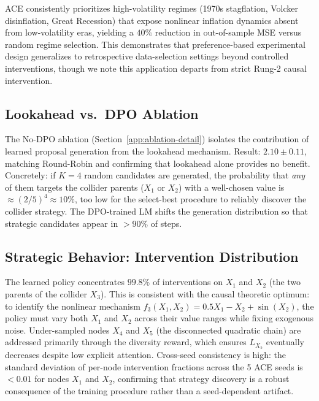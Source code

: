 ACE consistently prioritizes high-volatility regimes (1970s stagflation, Volcker disinflation, Great Recession) that expose nonlinear inflation dynamics absent from low-volatility eras, yielding a $40\%$ reduction in out-of-sample MSE versus random regime selection. This demonstrates that preference-based experimental design generalizes to retrospective data-selection settings beyond controlled interventions, though we note this application departs from strict Rung-2 causal intervention.

\subsection{Lookahead vs.\ DPO Ablation}
\label{app:lookahead}

The No-DPO ablation (Section~\ref{app:ablation-detail}) isolates the contribution of learned proposal generation from the lookahead mechanism. Result: $2.10\pm0.11$, matching Round-Robin and confirming that lookahead alone provides no benefit. Concretely: if $K=4$ random candidates are generated, the probability that \emph{any} of them targets the collider parents ($X_1$ or $X_2$) with a well-chosen value is $\approx (2/5)^{4} \approx 10\%$, too low for the select-best procedure to reliably discover the collider strategy. The DPO-trained LM shifts the generation distribution so that strategic candidates appear in $>90\%$ of steps.

\subsection{Strategic Behavior: Intervention Distribution}
\label{app:strategic}

The learned policy concentrates $99.8\%$ of interventions on $X_1$ and $X_2$ (the two parents of the collider $X_3$). This is consistent with the causal theoretic optimum: to identify the nonlinear mechanism $f_3(X_1, X_2) = 0.5 X_1 - X_2 + \sin(X_2)$, the policy must vary both $X_1$ and $X_2$ across their value ranges while fixing exogenous noise. Under-sampled nodes $X_4$ and $X_5$ (the disconnected quadratic chain) are addressed primarily through the diversity reward, which ensures $L_{X_5}$ eventually decreases despite low explicit attention. Cross-seed consistency is high: the standard deviation of per-node intervention fractions across the 5 ACE seeds is $<0.01$ for nodes $X_1$ and $X_2$, confirming that strategy discovery is a robust consequence of the training procedure rather than a seed-dependent artifact.

